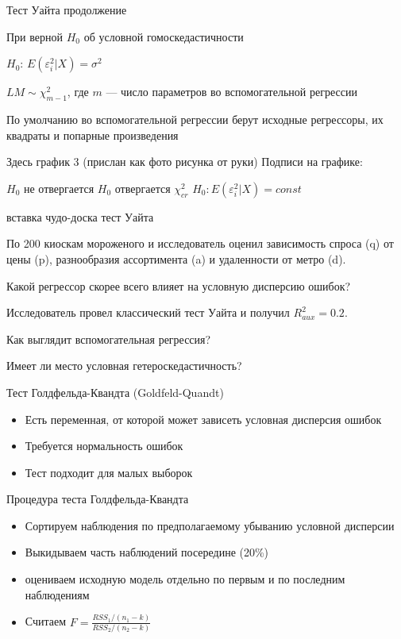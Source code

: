 \documentclass[ignorenonframetext,]{beamer}
\begin{document}
\begin{frame}{Тест Уайта продолжение}

При верной \(H_0\) об условной гомоскедастичности

\(H_0\): \(E(\varepsilon^2_i|X)=\sigma^2\)

\(LM \sim \chi^2_{m-1}\), где \(m\) --- число параметров во
вспомогательной регрессии

По умолчанию во вспомогательной регрессии берут исходные регрессоры, их
квадраты и попарные произведения

Здесь график 3 (прислан как фото рисунка от руки) Подписи на графике:

\(H_0\) не отвергается \(H_0\) отвергается \(\chi^2_{cr}\)
\(H_0: E(\varepsilon_i^2 | X)=const\)

\end{frame}

\begin{frame}{вставка чудо-доска тест Уайта}

По 200 киоскам мороженого и исследователь оценил зависимость спроса (q)
от цены (p), разнообразия ассортимента (a) и удаленности от метро (d).

Какой регрессор скорее всего влияет на условную дисперсию ошибок?

Исследователь провел классический тест Уайта и получил
\(R^2_{aux}=0.2\).

Как выглядит вспомогательная регрессия?

Имеет ли место условная гетероскедастичность?

\end{frame}

\begin{frame}{Тест Голдфельда-Квандта (Goldfeld-Quandt)}

\begin{itemize}
\item
  Есть переменная, от которой может зависеть условная дисперсия ошибок
\item
  Требуется нормальность ошибок
\item
  Тест подходит для малых выборок
\end{itemize}

\end{frame}

\begin{frame}{Процедура теста Голдфельда-Квандта}

\begin{itemize}
\item
  Сортируем наблюдения по предполагаемому убыванию условной дисперсии
\item
  Выкидываем часть наблюдений посередине (20\%)
\item
  оцениваем исходную модель отдельно по первым и по последним
  наблюдениям
\item
  Считаем \(F=\frac{RSS_1/(n_1-k)}{RSS_2/(n_2-k)}\)
\end{itemize}

\end{frame}
\end{document}
